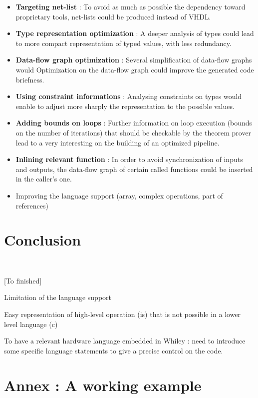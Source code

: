 \documentclass[10pt,a4paper]{article}
\renewcommand{\indent}{~\\\vspace{-.8cm}}
\begin{document}
\begin{itemize}
	\item \textbf{Targeting net-list} : To avoid as much as possible the dependency toward proprietary tools, net-lists could be produced instead of VHDL.
	\item \textbf{Type representation optimization} : A deeper analysis of types could lead to more compact representation of typed values, with less redundancy. 
	\item \textbf{Data-flow graph optimization} : Several simplification of data-flow graphs would Optimization on the data-flow graph could improve the generated code briefness.
	\item \textbf{Using constraint informations} : Analysing constraints on types would enable to adjust more sharply the representation to the possible values.
	\item \textbf{Adding bounds on loops} : Further information on loop execution (bounds on the number of iterations) that should be checkable by the theorem prover lead to a very interesting on the building of an optimized pipeline.
	\item \textbf{Inlining relevant function} : In order to avoid synchronization of inputs and outputs, the data-flow graph of certain called functions could be inserted in the caller's one.
	\item Improving the language support (array, complex operations, part of references)
\end{itemize}
 
\section*{Conclusion}\indent
{}

[To finished]

Limitation of the language support

Easy representation of high-level operation (is) that is not possible in a lower level language (c)

To have a relevant hardware language embedded in Whiley : need to introduce some specific language statements to give a precise control on the code.
 
 
 \newpage
 
 
\newpage
\section*{Annex : A working example}\indent
{}
\end{document}
